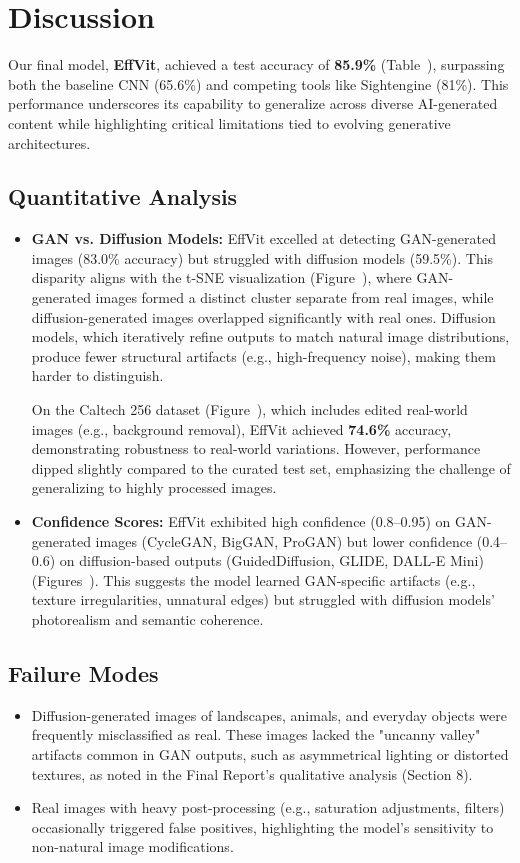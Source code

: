 \documentclass{article} %
\begin{document}
\section{Discussion}
Our final model, \textbf{EffVit}, achieved a test accuracy of \textbf{85.9\%} (Table~), surpassing both the baseline CNN (65.6\%) and competing tools like Sightengine (81\%). This performance underscores its capability to generalize across diverse AI-generated content while highlighting critical limitations tied to evolving generative architectures.

\subsection{Quantitative Analysis}
\begin{itemize}
    \item \textbf{GAN vs. Diffusion Models:}
    EffVit excelled at detecting GAN-generated images (83.0\% accuracy) but struggled with diffusion models (59.5\%). This disparity aligns with the t-SNE visualization (Figure~), where GAN-generated images formed a distinct cluster separate from real images, while diffusion-generated images overlapped significantly with real ones. Diffusion models, which iteratively refine outputs to match natural image distributions, produce fewer structural artifacts (e.g., high-frequency noise), making them harder to distinguish.
    
    On the Caltech 256 dataset (Figure~), which includes edited real-world images (e.g., background removal), EffVit achieved \textbf{74.6\%} accuracy, demonstrating robustness to real-world variations. However, performance dipped slightly compared to the curated test set, emphasizing the challenge of generalizing to highly processed images.

    \item \textbf{Confidence Scores:}
    EffVit exhibited high confidence (0.8--0.95) on GAN-generated images (CycleGAN, BigGAN, ProGAN) but lower confidence (0.4--0.6) on diffusion-based outputs (GuidedDiffusion, GLIDE, DALL-E Mini) (Figures~). This suggests the model learned GAN-specific artifacts (e.g., texture irregularities, unnatural edges) but struggled with diffusion models' photorealism and semantic coherence.
\end{itemize}

\subsection{Failure Modes}
\begin{itemize}
    \item Diffusion-generated images of landscapes, animals, and everyday objects were frequently misclassified as real. These images lacked the "uncanny valley" artifacts common in GAN outputs, such as asymmetrical lighting or distorted textures, as noted in the Final Report's qualitative analysis (Section 8).  
    \item Real images with heavy post-processing (e.g., saturation adjustments, filters) occasionally triggered false positives, highlighting the model's sensitivity to non-natural image modifications.
\end{itemize}
\end{document}
